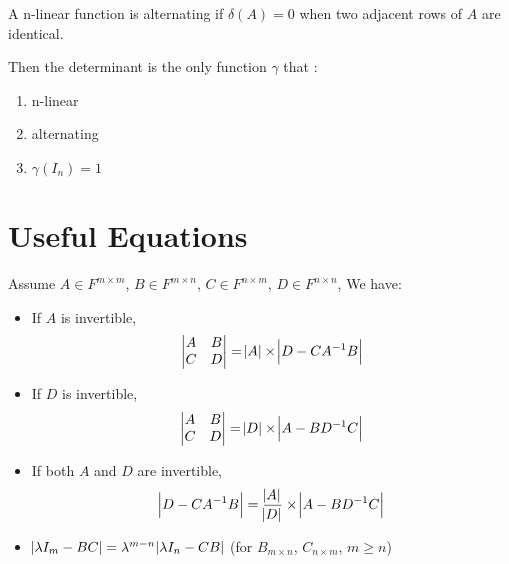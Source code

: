 \begin{definition}
    A n-linear function is alternating if $\delta (A) = 0$ when two adjacent rows of $A$ are identical.
\end{definition}

Then the determinant is the only function $\gamma$ that :
\begin{enumerate}
    \item n-linear
    \item alternating
    \item $\gamma(I_n) = 1$
\end{enumerate}


\section{Useful Equations}
\begin{theorem}
    Assume $A \in F^{m \times m}$, $B \in F^{m \times n}$, $C \in F^{n \times m}$, $D \in F^{n \times n}$, We have:
    \begin{itemize}
        \item If $A$ is invertible, \begin{equation}
            \begin{vmatrix}
                A & B \\
                C & D
                \end{vmatrix} = \abs{A} \times \abs{D - C {A}^{-1} B}
        \end{equation}
    \item If $D$ is invertible, \begin{equation}
            \begin{vmatrix}
                A & B \\
                C & D
                \end{vmatrix} = \abs{D} \times \abs{A - B {D}^{-1} C}
        \end{equation}
    \item If both $A$ and $D$ are invertible, \begin{equation}
        \abs{D - C {A}^{-1} B} = \frac{\abs{A}}{\abs{D}} \times \abs{A - B {D}^{-1} C}
        \end{equation}
    \item $\abs{\lambda I_m - BC} =\lambda^{m-n} \abs{\lambda I_n - CB}$ (for $B_{m \times n}$, $C_{n \times m}$, $m \geq n$)
    \end{itemize}
\end{theorem}


